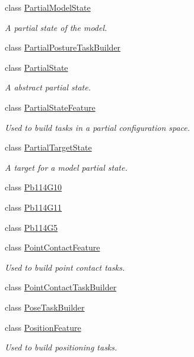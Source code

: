 \begin{DoxyCompactItemize}
class \hyperlink{classocra_1_1PartialModelState}{Partial\+Model\+State}
\begin{DoxyCompactList}\small\item\em A partial state of the model. \end{DoxyCompactList}\item 
class \hyperlink{classocra_1_1PartialPostureTaskBuilder}{Partial\+Posture\+Task\+Builder}
\item 
class \hyperlink{classocra_1_1PartialState}{Partial\+State}
\begin{DoxyCompactList}\small\item\em A abstract partial state. \end{DoxyCompactList}\item 
class \hyperlink{classocra_1_1PartialStateFeature}{Partial\+State\+Feature}
\begin{DoxyCompactList}\small\item\em Used to build tasks in a partial configuration space. \end{DoxyCompactList}\item 
class \hyperlink{classocra_1_1PartialTargetState}{Partial\+Target\+State}
\begin{DoxyCompactList}\small\item\em A target for a model partial state. \end{DoxyCompactList}\item 
class \hyperlink{classocra_1_1Pb114G10}{Pb114\+G10}
\item 
class \hyperlink{classocra_1_1Pb114G11}{Pb114\+G11}
\item 
class \hyperlink{classocra_1_1Pb114G5}{Pb114\+G5}
\item 
class \hyperlink{classocra_1_1PointContactFeature}{Point\+Contact\+Feature}
\begin{DoxyCompactList}\small\item\em Used to build point contact tasks. \end{DoxyCompactList}\item 
class \hyperlink{classocra_1_1PointContactTaskBuilder}{Point\+Contact\+Task\+Builder}
\item 
class \hyperlink{classocra_1_1PoseTaskBuilder}{Pose\+Task\+Builder}
\item 
class \hyperlink{classocra_1_1PositionFeature}{Position\+Feature}
\begin{DoxyCompactList}\small\item\em Used to build positioning tasks. \end{DoxyCompactList}\item 

\end{DoxyCompactItemize}
